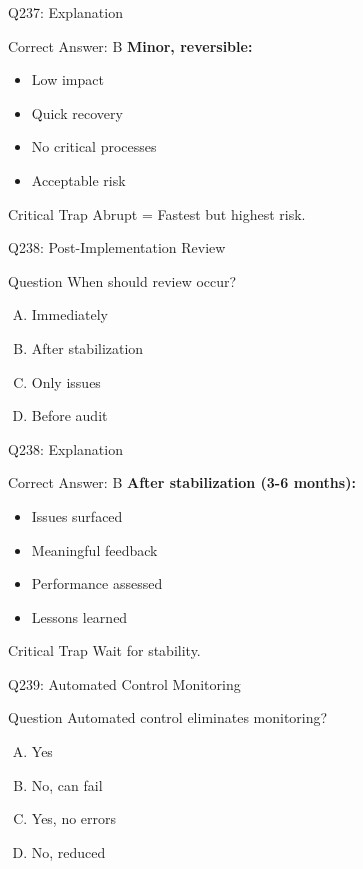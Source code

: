\documentclass{beamer}
\begin{document}
	\begin{frame}{Q237: Explanation}
		\begin{block}{Correct Answer: B}
			\textbf{Minor, reversible:}
			\begin{itemize}
				\item Low impact
				\item Quick recovery
				\item No critical processes
				\item Acceptable risk
			\end{itemize}
		\end{block}
		\begin{alertblock}{Critical Trap}
			Abrupt = Fastest but highest risk.
		\end{alertblock}
	\end{frame}
	
	\begin{frame}{Q238: Post-Implementation Review}
		\begin{block}{Question}
			When should review occur?
		\end{block}
		\begin{enumerate}[(A)]
			\item Immediately
			\item After stabilization
			\item Only issues
			\item Before audit
		\end{enumerate}
	\end{frame}
	
	\begin{frame}{Q238: Explanation}
		\begin{block}{Correct Answer: B}
			\textbf{After stabilization (3-6 months):}
			\begin{itemize}
				\item Issues surfaced
				\item Meaningful feedback
				\item Performance assessed
				\item Lessons learned
			\end{itemize}
		\end{block}
		\begin{alertblock}{Critical Trap}
			Wait for stability.
		\end{alertblock}
	\end{frame}
	
	\begin{frame}{Q239: Automated Control Monitoring}
		\begin{block}{Question}
			Automated control eliminates monitoring?
		\end{block}
		\begin{enumerate}[(A)]
			\item Yes
			\item No, can fail
			\item Yes, no errors
			\item No, reduced
		\end{enumerate}
	\end{frame}
	
\end{document}
